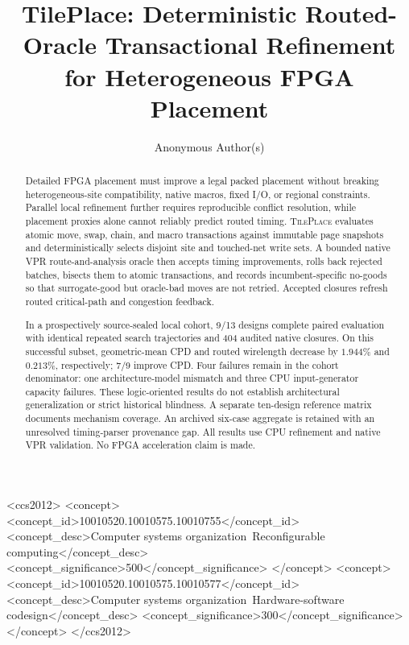 \documentclass[sigconf,anonymous,review]{acmart}
\newcommand{\system}{\textsc{TilePlace}}
\newcommand{\vpr}{\textsc{VPR}}
\begin{document}
\title{TilePlace: Deterministic Routed-Oracle Transactional Refinement for Heterogeneous FPGA Placement}

\author{Anonymous Author(s)}

\begin{abstract}
Detailed FPGA placement must improve a legal packed placement without breaking
heterogeneous-site compatibility, native macros, fixed I/O, or regional
constraints.  Parallel local refinement further requires reproducible conflict
resolution, while placement proxies alone cannot reliably predict routed
timing.  \system{} evaluates atomic move, swap, chain, and macro transactions
against immutable page snapshots and deterministically selects disjoint site
and touched-net write sets.  A bounded native \vpr{} route-and-analysis oracle
then accepts timing improvements, rolls back rejected batches, bisects them to
atomic transactions, and records incumbent-specific no-goods so that
surrogate-good but oracle-bad moves are not retried.  Accepted closures refresh
routed critical-path and congestion feedback.

In a prospectively source-sealed local cohort, 9/13 designs complete paired
evaluation with identical repeated search trajectories and 404 audited native
closures. On this successful subset, geometric-mean CPD and routed wirelength
decrease by $1.944\%$ and $0.213\%$, respectively; 7/9 improve CPD. Four
failures remain in the cohort denominator: one architecture-model mismatch
and three CPU input-generator capacity failures. These logic-oriented results
do not establish architectural generalization or strict historical blindness.
A separate ten-design reference matrix documents mechanism coverage.
An archived six-case aggregate is retained with an unresolved timing-parser
provenance gap. All results use CPU refinement and native \vpr{} validation.
No FPGA acceleration claim is made.
\end{abstract}

\begin{CCSXML}
<ccs2012>
 <concept>
  <concept_id>10010520.10010575.10010755</concept_id>
  <concept_desc>Computer systems organization~Reconfigurable computing</concept_desc>
  <concept_significance>500</concept_significance>
 </concept>
 <concept>
  <concept_id>10010520.10010575.10010577</concept_id>
  <concept_desc>Computer systems organization~Hardware-software codesign</concept_desc>
  <concept_significance>300</concept_significance>
 </concept>
</ccs2012>
\end{CCSXML}
\end{document}
